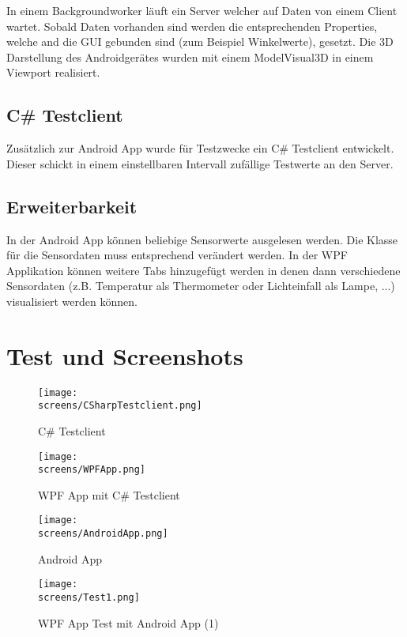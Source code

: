 \documentclass[12pt,a4paper]{article}
\begin{document}
In einem Backgroundworker läuft ein Server welcher auf Daten von einem Client wartet. Sobald Daten vorhanden sind werden die entsprechenden Properties, welche and die GUI gebunden sind (zum Beispiel Winkelwerte), gesetzt. Die 3D Darstellung des Androidgerätes wurden mit einem ModelVisual3D in einem Viewport realisiert.

\subsection{C\# Testclient}
Zusätzlich zur Android App wurde für Testzwecke ein C\# Testclient entwickelt. Dieser schickt in einem einstellbaren Intervall zufällige Testwerte an den Server.

\subsection{Erweiterbarkeit}
In der Android App können beliebige Sensorwerte ausgelesen werden. Die Klasse für die Sensordaten muss entsprechend verändert werden. In der WPF Applikation können weitere Tabs hinzugefügt werden in denen dann verschiedene Sensordaten (z.B. Temperatur als Thermometer oder Lichteinfall als Lampe, ...) visualisiert werden können.

\newpage
\section{Test und Screenshots}

\begin{figure}[!htb]%
\centering
\texttt{[image: \\screens/CSharpTestclient.png]}%
\caption{C\# Testclient}%
\label{}%
\end{figure}

\begin{figure}[!htb]%
\centering
\texttt{[image: \\screens/WPFApp.png]}%
\caption{WPF App mit C\# Testclient}%
\label{}%
\end{figure}



\begin{figure}[!htb]%
\centering
\texttt{[image: \\screens/AndroidApp.png]}%
\caption{Android App}%
\label{}%
\end{figure}

\begin{figure}[!htb]%
\centering
\texttt{[image: \\screens/Test1.png]}%
\caption{WPF App Test mit Android App (1)}%
\label{}%
\end{figure}
\end{document}
